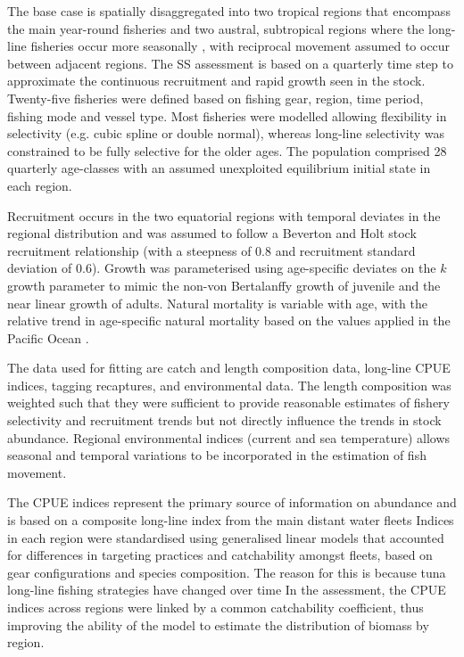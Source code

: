 \documentclass[12pt,halfline,a4paper,nonumbib]{ouparticle}
\begin{document}
The base case is spatially disaggregated into two tropical regions that encompass the main year-round fisheries and two austral, subtropical regions where the long-line fisheries occur more seasonally \parencite{langley2015yft}, with reciprocal movement assumed to occur between adjacent regions. The SS assessment is based on a quarterly time step to approximate the continuous recruitment and rapid growth seen in the stock. Twenty-five fisheries were defined based on fishing gear, region, time period, fishing mode and vessel type. Most fisheries were modelled allowing flexibility in selectivity (e.g. cubic spline or double normal), whereas long-line selectivity was constrained to be fully selective for the older ages. The population comprised 28 quarterly age-classes with an assumed unexploited equilibrium initial state in each region. 

Recruitment occurs in the two equatorial regions with temporal deviates in the regional distribution and was assumed to follow a Beverton and Holt stock recruitment relationship (with a steepness of 0.8 and recruitment standard deviation of 0.6).  Growth was parameterised using age-specific deviates on the $k$ growth parameter to mimic the non-von Bertalanffy growth of juvenile and the near linear growth of adults. Natural mortality is variable with age, with the relative trend in age-specific natural mortality based on the values applied in the Pacific Ocean \parencite{maunder2012review}. 


The data used for fitting are catch and length composition data, long-line CPUE indices, tagging recaptures, and environmental data. The length composition was weighted such that they were sufficient to provide reasonable estimates of fishery selectivity and recruitment trends but not directly influence the trends in stock abundance. Regional environmental indices (current and sea temperature) allows seasonal and temporal variations to be incorporated in the estimation of fish movement. 

The CPUE indices represent the primary source of information on abundance and is based on a composite long-line index from the main distant water fleets %
Indices in each region were standardised using generalised linear models that accounted for differences in targeting practices and catchability amongst fleets, based on gear configurations and species composition. The reason for this is because tuna long-line fishing strategies have changed over time %
In the assessment, the CPUE indices across regions were linked by a common catchability coefficient, thus improving the ability of the model to estimate the distribution of biomass by region. %
\end{document}

